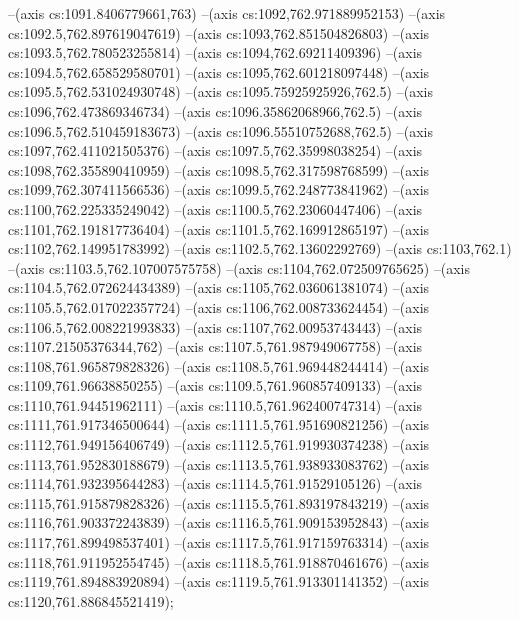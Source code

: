 --(axis cs:1091.8406779661,763)
--(axis cs:1092,762.971889952153)
--(axis cs:1092.5,762.897619047619)
--(axis cs:1093,762.851504826803)
--(axis cs:1093.5,762.780523255814)
--(axis cs:1094,762.69211409396)
--(axis cs:1094.5,762.658529580701)
--(axis cs:1095,762.601218097448)
--(axis cs:1095.5,762.531024930748)
--(axis cs:1095.75925925926,762.5)
--(axis cs:1096,762.473869346734)
--(axis cs:1096.35862068966,762.5)
--(axis cs:1096.5,762.510459183673)
--(axis cs:1096.55510752688,762.5)
--(axis cs:1097,762.411021505376)
--(axis cs:1097.5,762.35998038254)
--(axis cs:1098,762.355890410959)
--(axis cs:1098.5,762.317598768599)
--(axis cs:1099,762.307411566536)
--(axis cs:1099.5,762.248773841962)
--(axis cs:1100,762.225335249042)
--(axis cs:1100.5,762.23060447406)
--(axis cs:1101,762.191817736404)
--(axis cs:1101.5,762.169912865197)
--(axis cs:1102,762.149951783992)
--(axis cs:1102.5,762.13602292769)
--(axis cs:1103,762.1)
--(axis cs:1103.5,762.107007575758)
--(axis cs:1104,762.072509765625)
--(axis cs:1104.5,762.072624434389)
--(axis cs:1105,762.036061381074)
--(axis cs:1105.5,762.017022357724)
--(axis cs:1106,762.008733624454)
--(axis cs:1106.5,762.008221993833)
--(axis cs:1107,762.00953743443)
--(axis cs:1107.21505376344,762)
--(axis cs:1107.5,761.987949067758)
--(axis cs:1108,761.965879828326)
--(axis cs:1108.5,761.969448244414)
--(axis cs:1109,761.96638850255)
--(axis cs:1109.5,761.960857409133)
--(axis cs:1110,761.94451962111)
--(axis cs:1110.5,761.962400747314)
--(axis cs:1111,761.917346500644)
--(axis cs:1111.5,761.951690821256)
--(axis cs:1112,761.949156406749)
--(axis cs:1112.5,761.919930374238)
--(axis cs:1113,761.952830188679)
--(axis cs:1113.5,761.938933083762)
--(axis cs:1114,761.932395644283)
--(axis cs:1114.5,761.91529105126)
--(axis cs:1115,761.915879828326)
--(axis cs:1115.5,761.893197843219)
--(axis cs:1116,761.903372243839)
--(axis cs:1116.5,761.909153952843)
--(axis cs:1117,761.899498537401)
--(axis cs:1117.5,761.917159763314)
--(axis cs:1118,761.911952554745)
--(axis cs:1118.5,761.918870461676)
--(axis cs:1119,761.894883920894)
--(axis cs:1119.5,761.913301141352)
--(axis cs:1120,761.886845521419);

